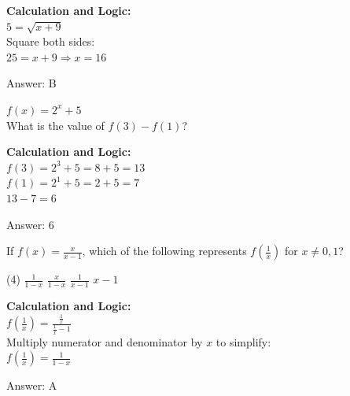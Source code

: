 \documentclass[11pt,paper=a4,answers]{exam}
\begin{document}
\begin{questions}
\begin{solution}
\textbf{Calculation and Logic:} \\
$5 = \sqrt{x+9}$ \\
Square both sides: \\
$25 = x + 9 \Rightarrow x = 16$

\vspace{25pt}

Answer: \colorbox{yellow!100}{B}
\end{solution}

\vspace{40pt}

\question
$f(x) = 2^x + 5$ \\
What is the value of $f(3) - f(1)$?

\begin{solution}
\textbf{Calculation and Logic:} \\
$f(3) = 2^3 + 5 = 8 + 5 = 13$ \\
$f(1) = 2^1 + 5 = 2 + 5 = 7$ \\
$13 - 7 = 6$

\vspace{25pt}

Answer: \colorbox{yellow!100}{6}
\end{solution}

\vspace{40pt}

\question
If $f(x) = \frac{x}{x-1}$, which of the following represents $f(\frac{1}{x})$ for $x \neq 0, 1$?
\begin{tasks}(4)
    \task $\frac{1}{1-x}$
    \task $\frac{x}{1-x}$
    \task $\frac{1}{x-1}$
    \task $x-1$
\end{tasks}

\begin{solution}
\textbf{Calculation and Logic:} \\
$f(\frac{1}{x}) = \frac{\frac{1}{x}}{\frac{1}{x} - 1}$ \\
Multiply numerator and denominator by $x$ to simplify: \\
$f(\frac{1}{x}) = \frac{1}{1 - x}$

\vspace{25pt}

Answer: \colorbox{yellow!100}{A}
\end{solution}

\vspace{40pt}


\end{questions}
\end{document}
